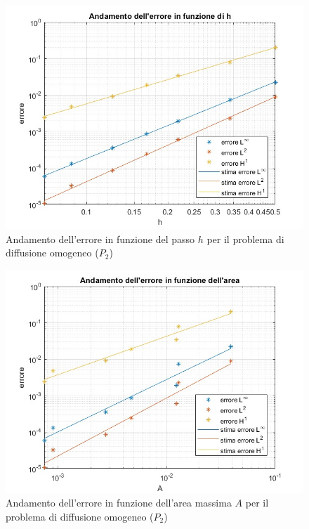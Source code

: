 \documentclass[%
	corpo=11pt,
    twoside,
    stile=classica,
    oldstyle,
    tipotesi=custom,
    greek,
    evenboxes,
]{toptesi}
\begin{document}
\begin{figure}[htbp]
  \centering
    \includegraphics[scale=0.4]{Pictures/errore-p2-h.jpg}
    \caption{Andamento dell'errore in funzione del passo $h$ per il problema di diffusione omogeneo ($P_2$)}
    \label{fig:p2_h}
    \end{figure}
    
    \begin{figure}[htbp]
  \centering
    \includegraphics[scale=0.4]{Pictures/errore-p2-area.jpg}
    \caption{Andamento dell'errore in funzione dell'area massima $A$ per il problema di diffusione omogeneo ($P_2$)}
    \label{fig:p2_area}
    \end{figure}
    
\end{document}
